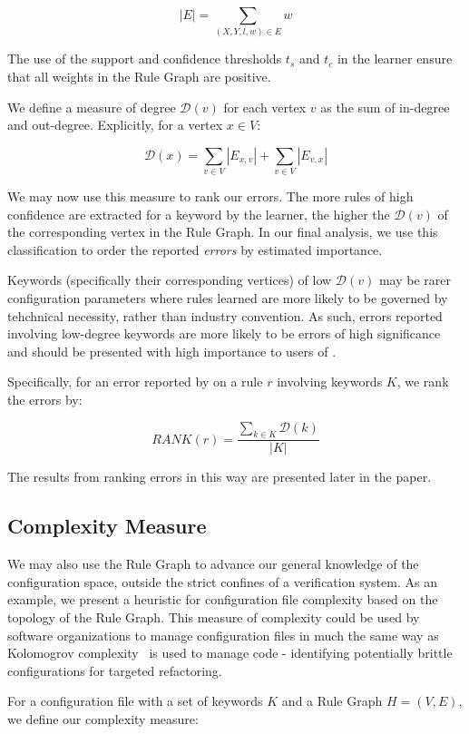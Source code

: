     $$|E| = \sum_{(X, Y, l, w) \in E} w$$

The use of the support and confidence thresholds $t_s$ and $t_c$ in the learner ensure 
that all weights in the Rule Graph are positive.

We define a measure of degree $\mathcal{D}(v)$ for each vertex $v$ as the sum of 
in-degree and out-degree. Explicitly, for a vertex $x \in V$:

    $$\mathcal{D}(x) = \sum_{v \in V} |E_{x, v}| + \sum_{v \in V} |E_{v, x}|$$

We may now use this measure to rank our errors.
The more rules of high confidence are extracted for a keyword by the learner, 
the higher the $\mathcal{D}(v)$ of the corresponding vertex in the Rule Graph.
In our final analysis, we use this classification to
order the reported {\it errors} by estimated importance.

Keywords (specifically their corresponding vertices)
of low $\mathcal{D}(v)$ may be rarer configuration
parameters where rules learned are more likely to be governed by 
tehchnical necessity, rather than industry convention. As such, errors
reported involving low-degree keywords are more likely to be errors
of high significance and should be presented with high importance
to users of \app.

Specifically, for an error reported by \app on a rule $r$ involving
keywords $K$, we rank the errors by:

    $$RANK(r) = \frac{\sum_{k \in K} \mathcal{D}(k)}{|K|}$$

The results from ranking errors in this way are presented later in
the paper.

\subsection{Complexity Measure}

We may also use the Rule Graph to advance our general knowledge
of the configuration space, outside the strict confines of a
verification system. As an example, we present a heuristic
for configuration file complexity based on the topology of the
Rule Graph. This measure of complexity could be used by software
organizations to manage configuration files in much the same way
as Kolomogrov complexity~\cite{kolomogrov} is used to manage code - identifying
potentially brittle configurations for targeted refactoring.


For a configuration file with a set of keywords $K$
and a Rule Graph $H = (V, E)$, we define our complexity measure:

